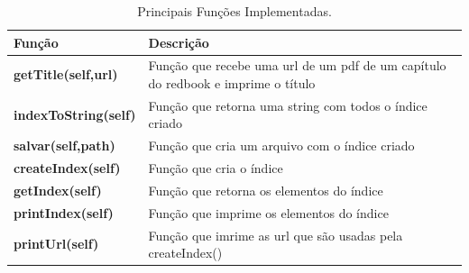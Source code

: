  \begin{table}[h]
\begin{center}
\caption{Principais Funções Implementadas.}
\label{tabela:FuncoesProg}
\begin{tabular}{l p{5cm}}  %
Função & Descrição\\ \hline\hline
\textbf{getTitle(self,url)} & Função que recebe uma url de um pdf de um capítulo do redbook e imprime o título   \\ \hline
\textbf{indexToString(self)} & Função que retorna uma string com todos o índice criado  \\ \hline
\textbf{salvar(self,path)} & Função que cria um arquivo com o índice criado  \\ \hline
\textbf{createIndex(self)} & Função que cria o índice  \\ \hline
\textbf{getIndex(self)} & Função que retorna os elementos do índice  \\ \hline
\textbf{printIndex(self)} & Função que imprime os elementos do índice  \\ \hline
\textbf{printUrl(self)} & Função que imrime as url que são usadas pela createIndex()  \\ \hline
\end{tabular}
\end{center}
\end{table}
